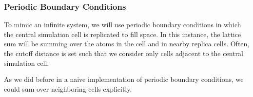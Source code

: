 \documentclass[11pt]{article}
\begin{document}
    \hypertarget{periodic-boundary-conditions}{%
\subsubsection{Periodic Boundary
Conditions}\label{periodic-boundary-conditions}}

To mimic an infinite system, we will use periodic boundary conditions in
which the central simulation cell is replicated to fill space. In this
instance, the lattice sum will be summing over the atoms in the cell and
in nearby replica cells. Often, the cutoff distance is set such that we
consider only cells adjacent to the central simulation cell.

As we did before in a naive implementation of periodic boundary
conditions, we could sum over neighboring cells explicitly.
\end{document}
